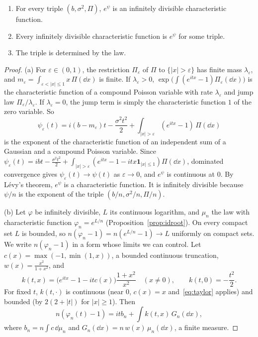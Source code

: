 \begin{theorem}\label{thm:lk}
\begin{enumerate}[label=(\alph*)]
\item For every triple $(b,\sigma^2,\Pi)$, $e^\psi$ is an infinitely divisible characteristic function.
\item Every infinitely divisible characteristic function is $e^\psi$ for some triple.
\item The triple is determined by the law.
\end{enumerate}
\end{theorem}
\begin{proof}
(a) For $\varepsilon\in(0,1)$, the restriction $\Pi_\varepsilon$ of $\Pi$ to $\{|x|>\varepsilon\}$ has finite mass $\lambda_\varepsilon$, and $m_\varepsilon=\int_{\varepsilon<|x|\le1}x\,\Pi(\dd x)$ is
finite. If $\lambda_\varepsilon>0$, $\exp\bigl(\int(e^{itx}-1)\Pi_\varepsilon(\dd x)\bigr)$ is the characteristic function of a compound Poisson variable with rate $\lambda_\varepsilon$ and jump law $\Pi_\varepsilon/\lambda_\varepsilon$. If $\lambda_\varepsilon=0$, the jump term is simply the characteristic function $1$ of the zero variable. So
\[
\psi_\varepsilon(t)=i(b-m_\varepsilon)t-\frac{\sigma^2t^2}2+\int_{|x|>\varepsilon}(e^{itx}-1)\,\Pi(\dd x)
\]
is the exponent of the characteristic function of an independent sum of a Gaussian and a compound Poisson variable. Since $\psi_\varepsilon(t)=ibt-\frac{\sigma^2t^2}2+\int_{|x|>\varepsilon}(e^{itx}-1-itx\mathbf 1_{|x|\le1})\Pi(\dd x)$, dominated convergence gives
$\psi_\varepsilon(t)\to\psi(t)$ as $\varepsilon\to0$, and
$e^\psi$ is continuous at $0$. By L\'evy's theorem, $e^\psi$ is a characteristic function. It is infinitely divisible because $\psi/n$ is the exponent of the triple
$(b/n,\sigma^2/n,\Pi/n)$.

(b) Let $\varphi$ be infinitely divisible, $L$ its continuous logarithm, and $\mu_n$ the law with characteristic function $\varphi_n=e^{L/n}$
(Proposition~\ref{prop:idroot}). On every compact set $L$ is bounded, so $n(\varphi_n-1)=n(e^{L/n}-1)\to L$ uniformly on compact sets. We write
$n(\varphi_n-1)$ in a form whose limits we can control. Let $c(x)=\max(-1,\min(1,x))$, a bounded continuous truncation, $w(x)=\frac{x^2}{1+x^2}$, and
\[
k(t,x)=\bigl(e^{itx}-1-itc(x)\bigr)\frac{1+x^2}{x^2}\quad(x\ne0),\qquad k(t,0)=-\frac{t^2}2.
\]
For fixed $t$, $k(t,\cdot)$ is continuous (near $0$, $c(x)=x$ and~\eqref{eq:taylor} applies) and bounded (by $2(2+|t|)$ for $|x|\ge1$). Then
\begin{equation}\label{eq:khintchine}
n(\varphi_n(t)-1)=itb_n+\int k(t,x)\,G_n(\dd x),
\end{equation}
where $b_n=n\int c\,\dd\mu_n$ and $G_n(\dd x)=n\,w(x)\,\mu_n(\dd x)$, a finite measure.


\end{proof}
